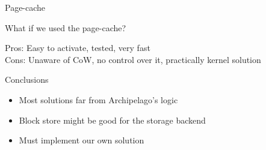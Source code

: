 \begin{frame}{Page-cache}

	What if we used the page-cache?

	\dspc
	Pros: Easy to activate, tested, very fast\\
	Cons: Unaware of CoW, no control over it, practically kernel solution\\

\end{frame}

\begin{frame}{Conclusions}

	\begin{itemize}
		\item Most solutions far from Archipelago's logic
		\item Block store might be good for the storage backend
		\item Must implement our own solution
	\end{itemize}
\end{frame}
	
